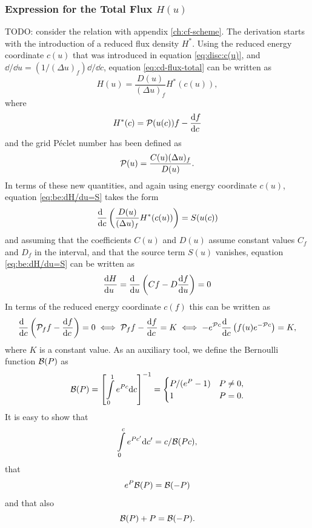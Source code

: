 \documentclass{book}
\newcommand{\Pe}[0]{{\ensuremath{{\cal P}}}}
\begin{document}
\subsubsection{Expression for the Total Flux $H(u)$}

TODO: consider the relation with appendix \ref{ch:cf-scheme}.
The derivation starts with the introduction of a reduced flux density $H^*$.
Using the reduced energy coordinate $c(u)$ that was introduced in equation
\eqref{eq:disc:c(u)}, and $\dd{}/\dd{u}=(1/(\Delta u)_f)\dd{}/\dd{c}$, equation
\eqref{eq:cd-flux-total} can be written as
\begin{equation}
	H(u) = \frac{D(u)}{(\Delta u)_f}H^*(c(u)),
\end{equation}
where
\begin{equation}
	H^*(c) = \Pe(u(c))f-\DERIV{f}{c}
\end{equation}
and the grid P\'eclet number has been defined as
\begin{equation}
	\Pe(u) = \frac{C(u)(\Delta u)_f}{D(u)}.
	\label{eq:Peclet}
\end{equation}
In terms of these new quantities, and again using energy coordinate $c(u)$,
equation \eqref{eq:be:dH/du=S} takes the form
\begin{equation}
	\DERIV{}{c}\left(\frac{D(u)}{(\Delta u)_f}H^*(c(u))\right) = S(u(c))
\end{equation}
and assuming that the coefficients $C(u)$ and $D(u)$ assume constant values
$C_f$ and $D_f$ in the interval, and that the source term $S(u)$ vanishes,
equation \eqref{eq:be:dH/du=S} can be written as
\begin{equation}
	\DERIV{H}{u} = \DERIV{}{u}\left(Cf - D\DERIV{f}{u}\right)=0
\end{equation}
In terms of the reduced energy coordinate $c(f)$ this can be written as
\begin{equation}
	\DERIV{}{c}\left(\Pe_ff - \DERIV{f}{c}\right)=0
	\iff
	\Pe_ff - \DERIV{f}{c}=K
	\iff
	-e^{\Pe c}\DERIV{}{c}\left(f(u)e^{-\Pe c}\right) = K,
	\label{ch:disc:be-hom-flux}
\end{equation}
where $K$ is a constant value.
As an auxiliary tool, we define the Bernoulli function ${\cal B}(P)$ as
\begin{equation}
	{\cal B}(P)
	= \left[\int\limits_0^1 e^{Pc}\mathrm{d}{{c}}\right]^{-1}
	= \begin{cases}
		P/(e^P-1) & P \neq 0, \\
		1 & P=0.
	\end{cases}
	\label{eq:disc:bernoulli}
\end{equation}
It is easy to show that
\begin{equation}
	\int\limits_0^c e^{Pc'}\mathrm{d}{{c'}} = c/{\cal B}(Pc),
	\label{eq:disc:bernoulli-incomplete}
\end{equation}
that
\begin{equation}
	e^P{\cal B}(P) = {\cal B}(-P)
	\label{eq:disc:e^PB(p)=B(-p)}
\end{equation}
and that also
\begin{equation}
	{\cal B}(P)+P = {\cal B}(-P).
	\label{eq:disc:e^PB(p)=B(p)+P}
\end{equation}
\end{document}
